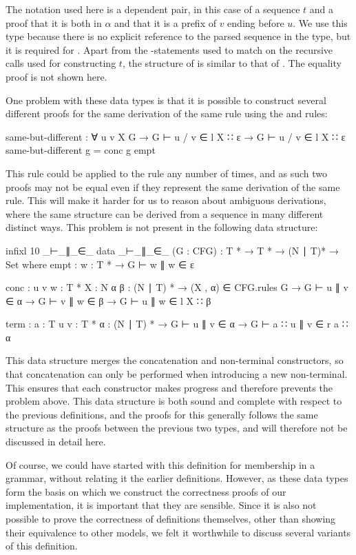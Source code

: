 	The  notation used here is a dependent pair, in this
	case of a sequence $t$ and a proof that it is both in $\alpha$ and that it
	is a prefix of $v$ ending before $u$. We use this type because there is no
	explicit reference to the parsed sequence in the  type,
	but it is required for . Apart from the
	-statements used to match on the recursive calls used for 
	constructing $t$, the structure of  is similar to that of
	. The equality proof  is not shown here.

	One problem with these data types is that it is possible to construct
	several different proofs for the same derivation of the same rule using the
	 and  rules:

	\begin{code}
		same-but-different : ∀ {u v X G} →
		  G ⊢ u / v ∈ l X ∷ ε →
		  G ⊢ u / v ∈ l X ∷ ε
		same-but-different g = conc g empt
	\end{code}

	This rule could be applied to the rule any number of times, and as such two
	proofs may not be equal even if they represent the same derivation of the
	same rule. This will make it harder for us to reason about ambiguous
	derivations, where the same structure can be derived from a sequence in
	many different distinct ways. This problem is not present in the following
	data structure:

	\begin{code}
		infixl 10 _⊢_∥_∈_
		data _⊢_∥_∈_ (G : CFG) : T * → T * → (N ∣ T)* → Set where
		  empt : {w : T *} →
		    G ⊢ w ∥ w ∈ ε

		  conc : {u v w : T *} {X : N} {α β : (N ∣ T) *} →
		    (X , α) ∈ CFG.rules G →
		    G ⊢ u ∥ v ∈ α →
		    G ⊢ v ∥ w ∈ β →
		      G ⊢ u ∥ w ∈ l X ∷ β

		  term : {a : T} {u v : T *} {α : (N ∣ T) *} →
		    G ⊢ u ∥ v ∈ α →
		      G ⊢ a ∷ u ∥ v ∈ r a ∷ α
	\end{code}
	
	This data structure merges the concatenation and non-terminal constructors,
	so that concatenation can only be performed when introducing a new
	non-terminal. This ensures that each constructor makes progress and
	therefore prevents the problem above. This data structure is both sound and
	complete with respect to the previous definitions, and the proofs for this
	generally follows the same structure as the proofs between the previous two
	types, and will therefore not be discussed in detail here.

	Of course, we could have started with this definition for membership in a
	grammar, without relating it the earlier definitions. However, as these
	data types form the basis on which we construct the correctness proofs of
	our implementation, it is important that they are sensible. Since it is
	also not possible to prove the correctness of definitions themselves, other
	than showing their equivalence to other models, we felt it worthwhile to
	discuss several variants of this definition.

